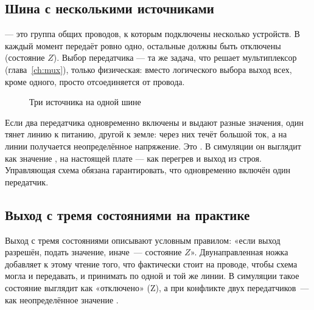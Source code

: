 \subsection{Шина с несколькими источниками}

 --- это группа общих проводов, к которым подключены несколько
устройств. В каждый момент передаёт ровно одно, остальные должны быть
отключены (состояние $Z$). Выбор передатчика --- та же задача, что решает
мультиплексор (глава~\ref{ch:mux}), только физическая: вместо логического
выбора выход всех, кроме одного, просто отсоединяется от провода.

\begin{figure}[H]
\centering
{}
\caption{Три источника на одной шине}
\end{figure}

\begin{warnbox}
Если два передатчика одновременно включены и выдают разные значения, один тянет
линию к питанию, другой к земле: через них течёт большой ток, а на линии
получается неопределённое напряжение. Это . В
симуляции он выглядит как значение , на настоящей плате --- как
перегрев и выход из строя. Управляющая схема обязана гарантировать, что
одновременно включён один передатчик.
\end{warnbox}

\subsection{Выход с тремя состояниями на практике}

Выход с тремя состояниями описывают условным правилом: «если выход разрешён,
подать значение, иначе~--- состояние $Z$». Двунаправленная ножка добавляет к
этому чтение того, что фактически стоит на проводе, чтобы схема могла и
передавать, и принимать по одной и той же линии. В симуляции такое
состояние выглядит как «отключено» (Z), а при конфликте двух передатчиков~---
как неопределённое значение .

